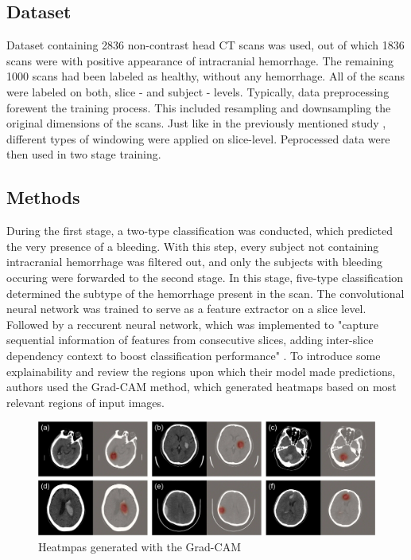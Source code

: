 \subsection*{Dataset}
Dataset containing 2836 non-contrast head CT scans was used, out of which 1836 scans were with positive appearance of intracranial hemorrhage. The remaining 1000 scans had been labeled as healthy, without any hemorrhage. All of the scans were labeled on both, slice - and subject - levels. Typically, data preprocessing forewent the training process. This included resampling and downsampling the original dimensions of the scans. Just like in the previously mentioned study \cite{relatedWork1}, different types of windowing were applied on slice-level. Peprocessed data were then used in two stage training. 
\subsection*{Methods}
During the first stage, a two-type classification was conducted, which predicted the very presence of a bleeding. With this step, every subject not containing intracranial hemorrhage was filtered out, and only the subjects with bleeding occuring were forwarded to the second stage. In this stage, five-type classification determined the subtype of the hemorrhage present in the scan. The convolutional neural network was trained to serve as a feature extractor on a slice level. Followed by a reccurent neural network, which was implemented to "capture sequential information of features from consecutive slices, adding inter-slice dependency context to boost classification performance" \cite{relatedWork2}. To introduce some explainability and review the regions upon which their model made predictions, authors used the Grad-CAM method, which generated heatmaps based on most relevant regions of input images.
\begin{figure}[!ht]
\begin{centering}
\includegraphics[width=15cm]{assets/images/RW2.jpg}
\par\end{centering}
\caption{Heatmpas generated with the Grad-CAM  \label{fig:rw2}}
\end{figure}
